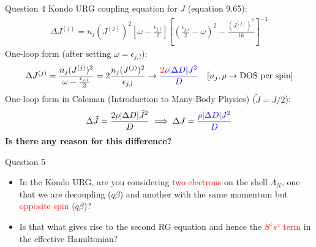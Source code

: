\documentclass[12pt,aspectratio=169]{beamer}
\newcommand{\qs}[1]{\textbf{\textcolor{bottlegreen}{#1}}}
\begin{document}
\begin{frame}{Question 4}
Kondo URG coupling equation for \(J\) (equation 9.65):
\begin{equation*}
\begin{aligned}
	\Delta J^{(j)}=n_{j}(J^{(j)})^{2}\left[\omega- \frac{\epsilon_{j,l}}{2}\right]\left[(\frac{\epsilon_{j,l}}{2}-\omega)^{2}-\frac{\left(J^{(j)}\right)^{2}}{16}\right]^{-1}
\end{aligned}
\end{equation*}
One-loop form (after setting \(\omega = \epsilon_{j,l}\)):
\begin{equation*}
\begin{aligned}
	\Delta J^{(j)}= \frac{n_{j}(J^{(j)})^{2}}{\omega-\frac{\epsilon_{j,l}}{2}} = 2\frac{n_{j}(J^{(j)})^{2}}{\epsilon_{j,l}} \rightarrow \textcolor{blue}{\frac{\textcolor{red}{2} \rho |\Delta D| J^2}{D}} && [n_j, \rho \rightarrow \text{DOS per spin}]
\end{aligned}
\end{equation*}
One-loop form in Coleman (Introduction to Many-Body Physics) (\(\tilde J = J/2\)):
\begin{equation*}
\begin{aligned}
	\Delta \tilde J = \frac{2 \rho |\Delta D| \tilde J^2}{D} \implies \Delta J = \textcolor{blue}{\frac{\rho |\Delta D| J^2}{D}}
\end{aligned}
\end{equation*}
\qs{Is there any reason for this difference?}
\end{frame}

\begin{frame}{Question 5}
	\begin{itemize}
		\item In the Kondo URG, are you considering \textcolor{red}{two electrons} on the shell \(\Lambda_N\), one that we are decoupling (\(q\beta\)) and another with the same momentum but \textcolor{red}{opposite spin} (\(q\overline\beta\))? 
			\vspace{30pt}
		\item Is that what gives rise to the second RG equation and hence the \textcolor{red}{\(S^z s^z\) term} in the effective Hamiltonian?
	\end{itemize}
\end{frame}
\end{document}
